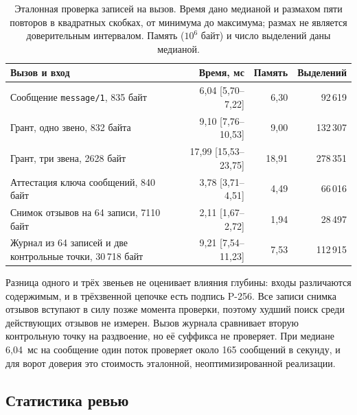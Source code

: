 \documentclass[10pt,a4paper]{article}
\begin{document}
\begin{table}[t]
\centering
\caption{Эталонная проверка записей на вызов. Время дано медианой и размахом пяти повторов в квадратных скобках, от минимума до максимума; размах не является доверительным интервалом. Память ($10^6$ байт) и число выделений даны медианой.}
\label{tab:bench}
\footnotesize
\begin{tabular}{L{7.6cm}rrr}
\toprule
Вызов и вход & Время, мс & Память & Выделений \\
\midrule
Сообщение \texttt{message/1}, 835 байт & 6,04 [5,70--7,22] & 6,30 & 92\,619 \\
Грант, одно звено, 832 байта & 9,10 [7,76--10,53] & 9,00 & 132\,307 \\
Грант, три звена, 2628 байт & 17,99 [15,53--23,75] & 18,91 & 278\,351 \\
Аттестация ключа сообщений, 840 байт & 3,78 [3,71--4,51] & 4,49 & 66\,016 \\
Снимок отзывов на 64 записи, 7110 байт & 2,11 [1,67--2,72] & 1,94 & 28\,497 \\
Журнал из 64 записей и две контрольные точки, 30\,718 байт & 9,21 [7,54--11,23] & 7,53 & 112\,915 \\
\bottomrule
\end{tabular}
\end{table}

Разница одного и трёх звеньев не оценивает влияния глубины: входы различаются содержимым, и в трёхзвенной цепочке есть подпись P-256. Все записи снимка отзывов вступают в силу позже момента проверки, поэтому худший поиск среди действующих отзывов не измерен. Вызов журнала сравнивает вторую контрольную точку на раздвоение, но её суффикса не проверяет. При медиане 6,04~мс на сообщение один поток проверяет около 165 сообщений в секунду, и для ворот доверия это стоимость эталонной, неоптимизированной реализации.

\subsection{Статистика ревью}
\end{document}
